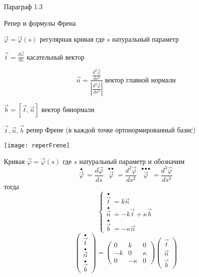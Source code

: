 \begin{title}[\Large]
  Параграф 1.3
\end{title}

\begin{title}[\Large]
  Репер и формулы Френа
\end{title}

\begin{define}
  $\vec \varphi = \vec \varphi (s)$ регулярная кривая где $s$ натуральный
  параметр

  $\vec t = \frac{d \vec \varphi}{ds}$ касательный вектор

  $$
  \vec n = \frac{\frac{d^2 \vec \varphi}{ds^2}}{\left|
  \frac{d^2 \vec \varphi}{ds^2}\right|} ~ \text{вектор главной нормали}
  $$

  $\vec b = [\vec t, \vec n]$ вектор бинормали

  $\vec t, \vec n, \vec b$ репер Френе (в каждой точке ортонормированный базис)

  \texttt{[image: reperFrene]}
\end{define}

\begin{block}
  Кривая $\vec \varphi = \vec \varphi(s)$ где $s$ натуральный параметр и
  обозначим
  $$
  \stackrel{\bullet}{\vec \varphi} ~ = \frac{d \vec \varphi}{ds} ~~~
  \stackrel{\bullet \bullet}{\vec \varphi} ~ = \frac{d^2 \vec \varphi}{ds^2} ~~~
  \stackrel{\bullet \bullet \bullet}{\vec \varphi} ~ =
  \frac{d^3 \vec \varphi}{ds^3}
  $$
  тогда
  $$
  \left\{
  \begin{array}{l}
    \stackrel{\bullet}{\vec t} ~ = k \vec n \\
    \stackrel{\bullet}{\vec n} ~ = -k \vec t + \kappa \vec b \\
    \stackrel{\bullet}{\vec b} ~ = - \kappa \vec n
  \end{array}
  \right.
  $$
  $$
  \left(
  \begin{array}{c}
    \stackrel{\bullet}{\vec t} \\
    \stackrel{\bullet}{\vec n} \\
    \stackrel{\bullet}{\vec b}
  \end{array}
  \right) =
  \left(
  \begin{array}{ccc}
    0 & k & 0 \\
    -k & 0 & \kappa \\
    0 & -\kappa & 0
  \end{array}
  \right)
  \left(
  \begin{array}{ccc}
    \vec t \\
    \vec n \\
    \vec b
  \end{array}
  \right)
  $$
\end{block}

